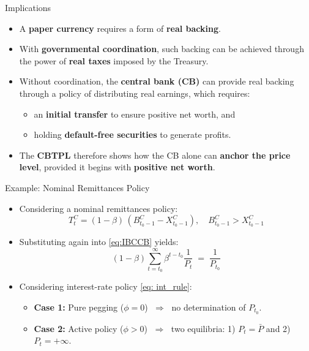 \documentclass[11pt,aspectratio=169]{beamer}
\begin{document}
\begin{frame}{Implications}
\small

\begin{itemize}
  \item A \textbf{paper currency} requires a form of \textbf{real backing}.
  
  \vspace{0.2cm}
  \item With \textbf{governmental coordination}, such backing can be achieved through the power of \textbf{real taxes} imposed by the Treasury.
  
  \vspace{0.2cm}
  \item Without coordination, the \textbf{central bank (CB)} can provide real backing through a policy of distributing real earnings, which requires:
  \begin{itemize}
    \item an \textbf{initial transfer} to ensure positive net worth, and  
    \item holding \textbf{default-free securities} to generate profits.  
  \end{itemize}
  
  \vspace{0.2cm}
  \item The \textbf{CBTPL} therefore shows how the CB alone can \textbf{anchor the price level}, provided it begins with \textbf{positive net worth}.
\end{itemize}

\end{frame}


\begin{frame}{Example: Nominal Remittances Policy}
\begin{itemize}
    \item Considering a nominal remittances policy:
    \[
      T_t^C = (1-\beta)\,(B_{t_0-1}^C - X_{t_0-1}^C), \quad B_{t_0-1}^C > X_{t_0-1}^C
    \]
    \vspace{0.15cm}
    \item Substituting again into \eqref{eq:IBCCB} yields:
    \begin{equation} \label{eq: nominal remittancy}
      (1-\beta)\sum_{t=t_0}^\infty \beta^{t-t_0}\frac{1}{P_t} \;=\; \frac{1}{P_{t_0}}
    \end{equation}
    \vspace{0.15cm}
    \item Considering interest-rate policy \eqref{eq: int_rule}:
    \begin{itemize}
        \item \textbf{Case 1:} Pure pegging ($\phi=0$) $\;\Rightarrow\;$ no determination of $P_{t_0}$.  
        \item \textbf{Case 2:} Active policy ($\phi>0$) $\;\Rightarrow\;$ two equilibria: 1) $P_t=\bar P$ and 2) $P_t=+\infty$.  
    \end{itemize}
\end{itemize}
\end{frame}
\end{document}
